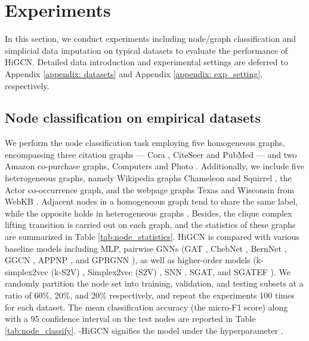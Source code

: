 \documentclass[letterpaper]{article} \usepackage{aaai24}
\theoremstyle{plain}
\theoremstyle{definition}
\theoremstyle{remark}
\begin{document}
\section{Experiments}
In this section, we conduct experiments including node/graph classification and simplicial data imputation on typical datasets to evaluate the performance of HiGCN. Detailed data introduction and experimental settings are deferred to Appendix \ref{appendix: datasets} and Appendix \ref{appendix: exp_setting}, respectively.




\subsection{Node classification on empirical datasets}



We perform the node classification task employing five homogeneous graphs, encompassing three citation graphs — Cora \cite{mccallum2000automating}, CiteSeer and PubMed \cite{Yang2016CiteGraph} — and two Amazon co-purchase graphs, Computers and Photo \cite{Shchur2018}. 
Additionally, we include five heterogeneous graphs, namely Wikipedia graphs Chameleon and Squirrel \cite{Rozemberczki2021}, the Actor co-occurrence graph, and the webpage graphs Texas and Wisconsin from WebKB \cite{Pei2020Geom-GCN}.
Adjacent nodes in a homogeneous graph tend to share the same label, while the opposite holds in heterogeneous graphs \cite{homo2020}. 
Besides, the clique complex lifting transition is carried out on each graph, and the statistics of these graphs are summarized in Table \ref{tab:node_statistics}.
HiGCN is compared with various baseline models including MLP, pairwise GNNs (GAT \cite{GAT2018}, ChebNet \cite{ChebNet}, BernNet \cite{BernNet}, GGCN \cite{GGCN}, APPNP \cite{APPNP}, and GPRGNN \cite{GPRGNN}), as well as higher-order models (k-simplex2vec (k-S2V) \cite{k-simplex2vec}, Simplex2vec (S2V) \cite{Simplex2vec}, SNN \cite{SNN2020}, SGAT, and SGATEF \cite{SGAT}). 
We randomly partition the node set into training, validation, and testing subsets at a ratio of 60\%, 20\%, and 20\% respectively, and repeat the experiments 100 times for each dataset. 
The mean classification accuracy (the micro-F1 score) along with a 95 confidence interval on the test nodes are reported in Table \ref{tab:node_classify}.
-HiGCN signifies the model under the hyperparameter . 
\end{document}
